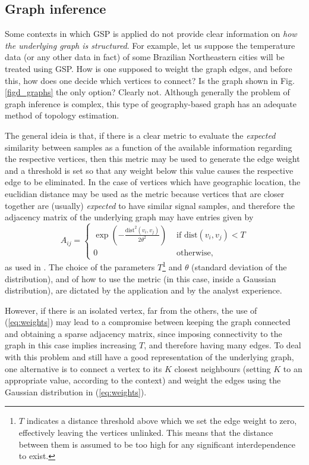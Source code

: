 \subsection{Graph inference}
\label{subsec:inferindo}

Some contexts in which GSP is applied do not provide clear information on \emph{how the underlying graph is structured}. For example, let us suppose the temperature data (or any other data in fact) of some Brazilian Northeastern cities will be treated using GSP. How is one supposed to weight the graph edges, and before this, how does one decide which vertices to connect? Is the graph shown in Fig. \ref{figd_graphs} the only option? Clearly not. Although generally the problem of graph inference is complex, this type of geography-based graph has an adequate method of topology estimation.

The general ideia is that, if there is a clear metric to evaluate the \emph{expected} similarity between samples as a function of the available information regarding the respective vertices, then this metric may be used to generate the edge weight and a threshold is set so that any weight below this value causes the respective edge to be eliminated. In the case of vertices which have geographic location, the euclidian distance may be used as the metric because vertices that are closer together are (usually) \emph{expected} to have similar signal samples, and therefore the adjacency matrix of the underlying graph may have entries given by
\begin{equation}
\label{eq:weights}
A_{ij} =
\begin{cases}
\displaystyle
\exp \left(- \frac{\text{dist}^2(v_i, v_j)}{2 \theta^2}\right)& \text{ if } \text{dist}(v_i, v_j) < T \\ 
0 & \text{ otherwise},
\end{cases}
\end{equation}
as used in \cite{shuman2013emerging}. The choice of the parameters $ T $\footnote{$ T $ indicates a distance threshold above which we set the edge weight to zero, effectively leaving the vertices unlinked. This means that the distance between them is assumed to be too high for any significant interdependence to exist.} and $ \theta $ (standard deviation of the distribution), and of how to use the metric (in this case, inside a Gaussian distribution), are dictated by the application and by the analyst experience. 

However, if there is an isolated vertex, far from the others, the use of (\ref{eq:weights}) may lead to a compromise between keeping the graph connected and obtaining a sparse adjacency matrix, since imposing connectivity to the graph in this case implies increasing $ T $, and therefore having many edges. To deal with this problem and still have a good representation of the underlying graph, one alternative is to connect a vertex to its $ K $ closest neighbours (setting $ K $ to an appropriate value, according to the context) and weight the edges using the Gaussian distribution in (\ref{eq:weights}).

